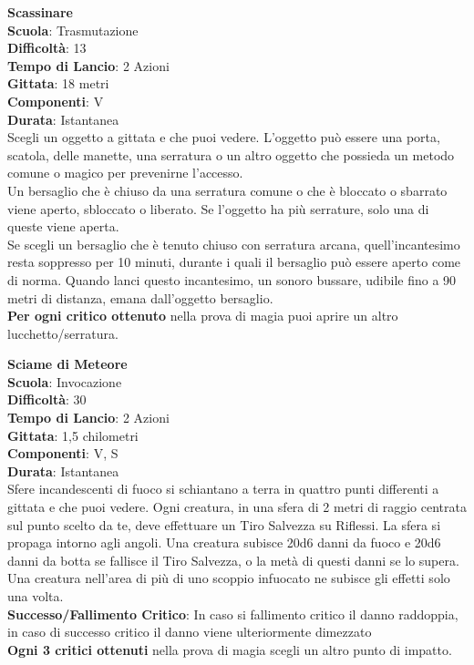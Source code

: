 \begin{multicols}{2}
\medskip\textbf{Scassinare}\\
\textbf{Scuola}: Trasmutazione\\
\textbf{Difficoltà}: 13\\
\textbf{Tempo di Lancio}: 2 Azioni\\
\textbf{Gittata}: 18 metri\\
\textbf{Componenti}: V\\
\textbf{Durata}: Istantanea\\
Scegli un oggetto a gittata e che puoi vedere. L'oggetto può essere una porta, scatola, delle manette, una serratura o un altro oggetto che possieda un metodo comune o magico per prevenirne l'accesso.\\
Un bersaglio che è chiuso da una serratura comune o che è bloccato o sbarrato viene aperto, sbloccato o liberato. Se l'oggetto ha più serrature, solo una di queste viene aperta.\\
Se scegli un bersaglio che è tenuto chiuso con serratura arcana, quell'incantesimo resta soppresso per 10 minuti, durante i quali il bersaglio può essere aperto come di norma. Quando lanci questo incantesimo, un sonoro bussare, udibile fino a 90 metri di distanza, emana dall'oggetto bersaglio.\\
\textbf{Per ogni critico ottenuto} nella prova di magia puoi aprire un altro lucchetto/serratura.

\medskip\textbf{Sciame di Meteore}\\
\textbf{Scuola}: Invocazione\\
\textbf{Difficoltà}: 30\\
\textbf{Tempo di Lancio}: 2 Azioni\\
\textbf{Gittata}: 1,5 chilometri\\
\textbf{Componenti}: V, S\\
\textbf{Durata}: Istantanea\\
Sfere incandescenti di fuoco si schiantano a terra in quattro punti differenti a gittata e che puoi vedere. Ogni creatura, in una sfera di 2 metri di raggio centrata sul punto scelto da te, deve effettuare un Tiro Salvezza su Riflessi. La sfera si propaga intorno agli angoli. Una creatura subisce 20d6 danni da fuoco e 20d6 danni da botta se fallisce il Tiro Salvezza, o la metà di
questi danni se lo supera. Una creatura nell'area di più di uno scoppio infuocato ne subisce gli effetti solo una volta.\\
\textbf{Successo/Fallimento Critico}: In caso si fallimento critico il danno raddoppia, in caso di successo critico il danno viene ulteriormente dimezzato\\
\textbf{Ogni 3 critici ottenuti} nella prova di magia scegli un altro punto di impatto.


\end{multicols}
